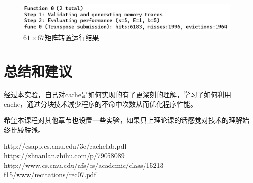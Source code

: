 \documentclass[supercite]{Experimental_Report}
\theoremstyle{definition}
\begin{document}
\begin{figure}[htb]
	\begin{center}
		\includegraphics[scale=0.9]{./images/lab2_8.jpg}
		\caption{$61\times67$矩阵转置运行结果}
		\label{fig2-8}
	\end{center}
\end{figure}

\section{总结和建议}

经过本实验，自己对cache是如何实现的有了更深刻的理解，学习了如何利用cache，通过分块技术减少程序的不命中次数从而优化程序性能。

希望本课程对其他章节也设置一些实验，如果只上理论课的话感觉对技术的理解始终比较肤浅。


\newpage
\begin{thebibliography}{99}
  http://csapp.cs.cmu.edu/3e/cachelab.pdf
  https://zhuanlan.zhihu.com/p/79058089
  http://www.cs.cmu.edu/afs/cs/academic/class/15213-f15/www/recitations/rec07.pdf

  \end{thebibliography}
\clearpage
\end{document}
